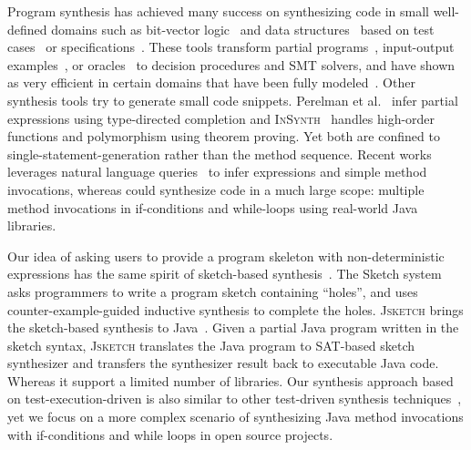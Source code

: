   Program synthesis has  achieved many success on synthesizing code in small well-defined domains such as bit-vector logic~\cite{oracle:icse10} and data structures~\cite{storyboard:fse11, demsky:issta06} based on test cases~\cite{testDriven:pldi14} or specifications~\cite{Kuncak:pldi10, cegis:13}. These tools transform partial programs~\cite{sketch:sttt13}, input-output examples~\cite{isil:pldi15, singh:pldi13}, or oracles~\cite{oracle:icse10, loop:pldi11} to decision procedures and SMT solvers, and have shown as very efficient in certain domains that have been fully modeled~\cite{insynth:cav11, verifySys:popl10}.  Other synthesis tools try to generate small code snippets.  Perelman et al.\/~\cite{typed:pldi12} infer partial expressions using type-directed completion and   \textsc{InSynth}~\cite{insynth:cav11}  handles high-order functions and polymorphism using theorem proving.  Yet both are confined to single-statement-generation rather than the method sequence.    Recent works leverages natural language queries~\cite{freeQuery:oopsla15, sniff:fase09, sumit:icse16} to infer expressions and simple method invocations, whereas \tool could synthesize code in a much large scope: multiple method invocations in if-conditions and while-loops using real-world Java libraries. 


Our idea of asking users to provide a program skeleton with non-deterministic expressions has the same spirit of sketch-based synthesis~\cite{sketch:aplas09}.  The Sketch system~\cite{sketch:sttt13} asks programmers to write a program sketch containing ``holes'', and uses counter-example-guided inductive synthesis to complete the holes.  \textsc{Jsketch} brings the sketch-based synthesis to Java~\cite{jsketch:fse15}. Given a partial Java program written in the sketch syntax, \textsc{Jsketch} translates the Java program to SAT-based sketch synthesizer and transfers the synthesizer result back to executable Java code. Whereas it support a limited number of libraries.  Our synthesis approach based on  test-execution-driven is also similar to other test-driven synthesis techniques~\cite{verifySys:popl10, testDriven:pldi14}, yet we focus on a more complex scenario of synthesizing Java method invocations with if-conditions and while loops in open source projects. 



